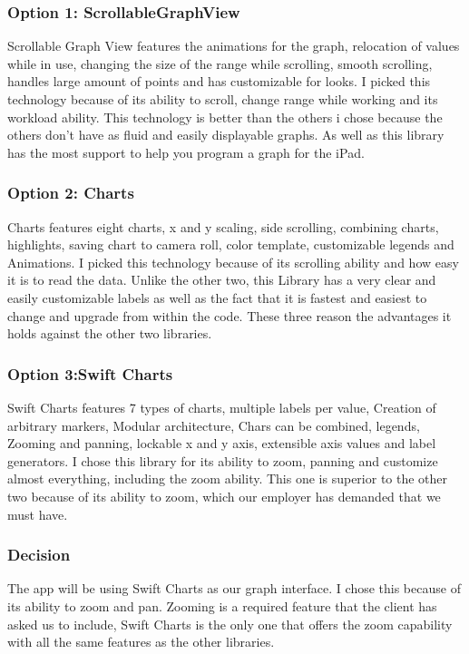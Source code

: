 \documentclass[onecolumn, draftclsnofoot,10pt, compsoc]{IEEEtran}
\begin{document}
\subsubsection{Option 1: ScrollableGraphView}
Scrollable Graph View features the animations for the graph, relocation of values while in use, changing the size of the range while scrolling, smooth scrolling, handles large amount of points and has customizable for looks.
 I picked this technology because of its ability to scroll, change range while working and its workload ability.
This technology is better than the others i chose because the others don't have as fluid and easily displayable graphs.
 As well as this library has the most support to help you program a graph for the iPad.


\subsubsection{Option 2: Charts}
	Charts features eight charts, x and y scaling, side scrolling, combining charts, highlights, saving chart to camera roll, color template, customizable legends and Animations.
I picked this technology because of its scrolling ability and how easy it is to read the data.
Unlike the other two, this Library has a very clear and easily customizable labels as well as the fact that it is fastest and easiest to change and upgrade from within the code.
 These three reason the advantages it holds against the other two libraries.
\subsubsection{Option 3:Swift Charts}
	Swift Charts features 7 types of charts, multiple labels per value, Creation of arbitrary markers, Modular architecture, Chars can be combined, legends, Zooming and panning, lockable x and y axis, extensible axis values and label generators.
I chose this library for its ability to zoom, panning and customize almost everything, including the zoom ability.
 This one is superior to the other two because of its ability to zoom, which our employer has demanded that we must have.
\subsubsection{Decision }
The app will be using Swift Charts as our graph interface.
 I chose this because of its ability to zoom and pan.
 Zooming is a required feature that the client has asked us to include, Swift Charts is the only one that offers the zoom capability with all the same features as the other libraries.
\end{document}
